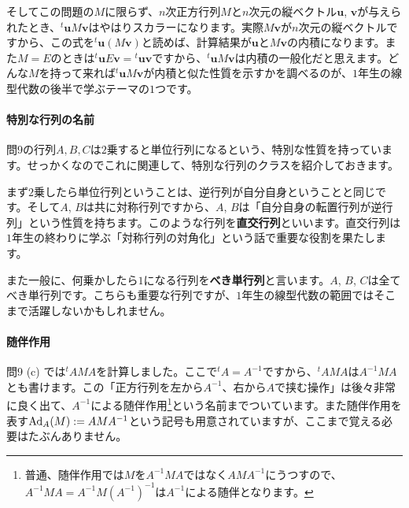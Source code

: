 そしてこの問題の$M$に限らず、$n$次正方行列$M$と$n$次元の縦ベクトル$\bm{u}$, $\bm{v}$が与えられたとき、${}^t\bm{u}M\bm{v}$はやはりスカラーになります。実際$M\bm{v}$が$n$次元の縦ベクトルですから、この式を${}^t\bm{u}(M\bm{v})$と読めば、計算結果が$\bm{u}$と$M\bm{v}$の内積になります。また$M=E$のときは${}^t\bm{u}E\bm{v}={}^t\bm{u}\bm{v}$ですから、${}^t\bm{u}M\bm{v}$は内積の一般化だと思えます。どんな$M$を持って来れば${}^t\bm{u}M\bm{v}$が内積と似た性質を示すかを調べるのが、$1$年生の線型代数の後半で学ぶテーマの$1$つです。

\paragraph{特別な行列の名前}

問9の行列$A, B, C$は$2$乗すると単位行列になるという、特別な性質を持っています。せっかくなのでこれに関連して、特別な行列のクラスを紹介しておきます。

まず$2$乗したら単位行列ということは、逆行列が自分自身ということと同じです。そして$A$, $B$は共に対称行列ですから、$A$, $B$は「自分自身の転置行列が逆行列」という性質を持ちます。このような行列を\textbf{直交行列}といいます。直交行列は$1$年生の終わりに学ぶ「対称行列の対角化」という話で重要な役割を果たします。

また一般に、何乗かしたら$1$になる行列を\textbf{べき単行列}と言います。$A$, $B$, $C$は全てべき単行列です。こちらも重要な行列ですが、$1$年生の線型代数の範囲ではそこまで活躍しないかもしれません。

\paragraph{随伴作用}

問9 (c) では${}^t\! AMA$を計算しました。ここで${}^t\! A=A^{-1}$ですから、${}^t\! AMA$は$A^{-1}MA$とも書けます。この「正方行列を左から$A^{-1}$、右から$A$で挟む操作」は後々非常に良く出て、$A^{-1}$による随伴作用\footnote{普通、随伴作用では$M$を$A^{-1}MA$ではなく$AMA^{-1}$にうつすので、$A^{-1}MA=A^{-1}M(A^{-1})^{-1}$は$A^{-1}$による随伴となります。}という名前までついています。また随伴作用を表す$\operatorname{Ad}_A(M):= AMA^{-1}$という記号も用意されていますが、ここまで覚える必要はたぶんありません。

